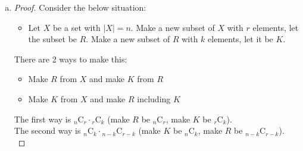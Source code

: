 \begin{enumerate} [(a)]
\begin{proof}
			{\color{cyan}\textbf{APPENDIX}}: The \textit{algebraic argument} is just calculate directly like following:
			\begin{align*}
				& k\cdot{_{n}\mathrm{C}_{k}}\\
				=\ & k\cdot\frac{n!}{k!(n - k)!}\\
				=\ & \frac{n!}{(k - 1)!(n - k)!}\\
				=\ & n\cdot\frac{(n - 1)!}{(k - 1)!(n - k)!}\\
				=\ & n\cdot\frac{(n - 1)!}{(k - 1)!(n - k)!}\\
				=\ & n\cdot\frac{(n - 1)!}{(k - 1)!(n - 1 - (k - 1))!}\\
				=\ & n\cdot{_{n - 1}\mathrm{C}_{k - 1}}
			\end{align*}
		\end{proof}
		\item \begin{proof}
			Consider the below situation:
			\begin{itemize}
				\item [] Let $X$ be a set with $|X| = n$. Make a new subset of $X$ with $r$ elements, let the subset be $R$. Make a new subset of $R$ with $k$ elements, let it be $K$.
			\end{itemize}
			\begin{center}
			\end{center}
			There are 2 ways to make this:
			\begin{itemize}
				\item Make $R$ from $X$ and make $K$ from $R$
				\item Make $K$ from $X$ and make $R$ including $K$
			\end{itemize}
			The first way is $_{n}\mathrm{C}_{r}\cdot{_{r}\mathrm{C}_{k}}$ (make $R$ be $_{n}\mathrm{C}_{r}$, make $K$ be $_{r}\mathrm{C}_{k}$).\\
			The second way is $_{n}\mathrm{C}_{k}\cdot{_{n - k}\mathrm{C}_{r - k}}$ (make $K$ be $_{n}\mathrm{C}_{k}$, make $R$ be $_{n - k}\mathrm{C}_{r - k}$).\\

\end{proof}
\end{enumerate}
